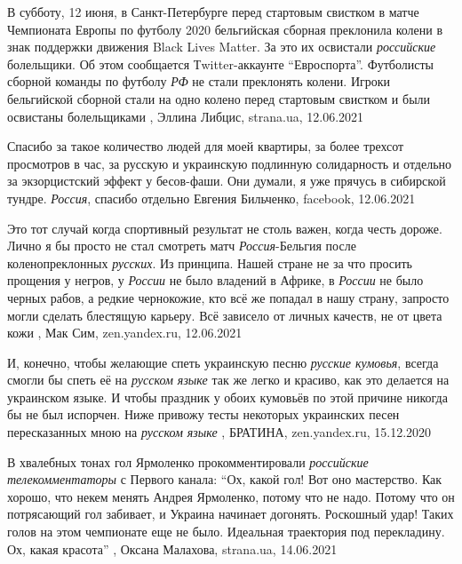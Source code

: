 В субботу, 12 июня, в Санкт-Петербурге перед стартовым свистком в матче
Чемпионата Европы по футболу 2020 бельгийская сборная преклонила колени в знак
поддержки движения Black Lives Matter. За это их освистали \emph{российские}
болельщики. Об этом сообщается Тwitter-аккаунте \enquote{Евроспорта}.
Футболисты сборной команды по футболу \emph{РФ} не стали преклонять колени.
Игроки бельгийской сборной стали на одно колено перед стартовым свистком и были
освистаны болельщиками
, 
Эллина Либцис, strana.ua, 12.06.2021

Спасибо за такое количество людей для моей квартиры, за более трехсот
просмотров в час, за русскую и украинскую подлинную солидарность и отдельно за
экзорцистский эффект у бесов-фаши. Они думали, я уже прячусь в сибирской
тундре. \emph{Россия}, спасибо отдельно
Евгения Бильченко, facebook, 12.06.2021

Это тот случай когда спортивный результат не столь важен, когда честь дороже.
Лично я бы просто не стал смотреть матч \emph{Россия}-Бельгия после коленопреклонных
\emph{русских}. Из принципа. Нашей стране не за что просить прощения у негров, у
\emph{России} не было владений в Африке, в \emph{России} не было черных рабов, а редкие
чернокожие, кто всё же попадал в нашу страну, запросто могли сделать блестящую
карьеру. Всё зависело от личных качеств, не от цвета кожи
, 
Мак Сим, zen.yandex.ru, 12.06.2021

И, конечно, чтобы желающие спеть украинскую песню \emph{русские кумовья}, всегда
смогли бы спеть её на \emph{русском языке} так же легко и красиво, как это делается на
украинском языке. И чтобы праздник у обоих кумовьёв по этой причине никогда бы
не был испорчен. Ниже привожу тесты некоторых украинских песен пересказанных
мною на \emph{русском языке}
, 
БРАТИНА, zen.yandex.ru, 15.12.2020

В хвалебных тонах гол Ярмоленко прокомментировали \emph{российские телекомментаторы} с
Первого канала: \enquote{Ох, какой гол! Вот оно мастерство. Как хорошо, что некем
менять Андрея Ярмоленко, потому что не надо. Потому что он потрясающий гол
забивает, и Украина начинает догонять. Роскошный удар! Таких голов на этом
чемпионате еще не было. Идеальная траектория под перекладину. Ох, какая
красота}
, 
Оксана Малахова, strana.ua, 14.06.2021

